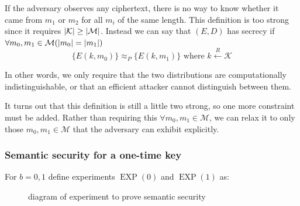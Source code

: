 \documentclass[10pt,a4paper]{report}
\begin{document}
If the adversary observes any ciphertext, there is no way to know whether it came from $m_1$ or
$m_2$ for all $m_i$ of the same length. This definition is too strong since it requires
$\abs{\mathcal{K}} \geq \abs{\mathcal{M}}$. Instead we can say that $(E, D)$ has secrecy if
$\forall m_0, m_1 \in \mathcal{M} (\abs{m_0} = \abs{m_1})$
    $$ \{E(k, m_0)\} \approx_P \{E(k, m_1)\} \text{ where } k \xleftarrow{R} \mathcal{K} $$

In other words, we only require that the two distributions are computationally indistinguishable,
or that an efficient attacker cannot distinguish between them.

It turns out that this definition is still a little two strong, so one more constraint must be
added. Rather than requiring this $\forall m_0, m_1 \in \mathcal{M}$, we can relax it to only those
$m_0, m_1 \in \mathcal{M}$ that the adversary can exhibit explicitly.

\subsubsection*{Semantic security for a one-time key}

For $b = 0,1$ define experiments $\operatorname{EXP}(0)$ and $\operatorname{EXP}(1)$ as:

\begin{figure}[H]
    \centering
    \caption{diagram of experiment to prove semantic security}
    \label{fig:semantic_security_diagram}
\end{figure}
\end{document}
